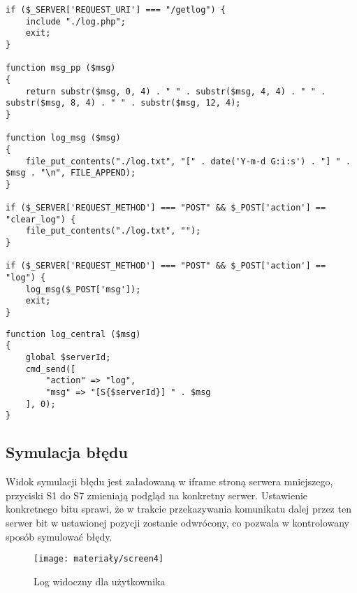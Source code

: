 \newpage
\begin{empty}
	\begin{verbatim}
if ($_SERVER['REQUEST_URI'] === "/getlog") {
	include "./log.php";
	exit;
}

function msg_pp ($msg)
{
	return substr($msg, 0, 4) . " " . substr($msg, 4, 4) . " " . substr($msg, 8, 4) . " " . substr($msg, 12, 4);
}

function log_msg ($msg)
{
	file_put_contents("./log.txt", "[" . date('Y-m-d G:i:s') . "] " . $msg . "\n", FILE_APPEND);
}

if ($_SERVER['REQUEST_METHOD'] === "POST" && $_POST['action'] == "clear_log") {
	file_put_contents("./log.txt", "");
}

if ($_SERVER['REQUEST_METHOD'] === "POST" && $_POST['action'] == "log") {
	log_msg($_POST['msg']);
	exit;
}
	\end{verbatim}
	\vspace{-10pt}
\end{empty}

\begin{empty}
	\begin{verbatim}
function log_central ($msg)
{
	global $serverId;
	cmd_send([
		"action" => "log",
		"msg" => "[S{$serverId}] " . $msg
	], 0);
}
	\end{verbatim}
	\vspace{-10pt}
\end{empty}

\newpage
\subsection{Symulacja błędu}
Widok symulacji błędu jest załadowaną w iframe stroną serwera mniejszego, przyciski S1 do S7 zmieniają podgląd na konkretny serwer. Ustawienie konkretnego bitu sprawi, że w trakcie przekazywania komunikatu dalej przez ten serwer bit w ustawionej pozycji zostanie odwrócony, co pozwala w kontrolowany sposób symulować błędy. 


\begin{figure}[H]
	\centering
	\texttt{[image: materiały/screen4]}
	\caption{Log widoczny dla użytkownika}
\end{figure}

